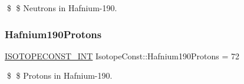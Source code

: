 \$ \$ Neutrons in Hafnium-\/190. \mbox{\label{group___isotope_const-_hafnium-_hf190_gaa5ee5bdad1617a0aa6bb0a4472e33e61}} 
\subsubsection{\texorpdfstring{Hafnium190\+Protons}{Hafnium190Protons}}
{\footnotesize\ttfamily \mbox{\hyperlink{group___isotope_const-_macros_ga5f18360b3e99483a35c32d789e62621c}{I\+S\+O\+T\+O\+P\+E\+C\+O\+N\+S\+T\+\_\+\+I\+NT}} Isotope\+Const\+::\+Hafnium190\+Protons = 72}

\$ \$ Protons in Hafnium-\/190. 